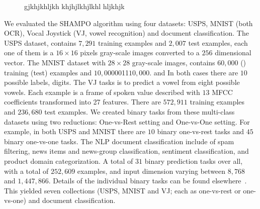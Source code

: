 \begin{figure}[!t]
\begin{centering}
\caption{gjkhjkhljkh khjhjlkhjlkhl hljkhjk  }
\end{centering}
\vspace{-0.5cm}
\end{figure}

We evaluated the SHAMPO algorithm using four datasets: USPS, MNIST (both OCR), Vocal Joystick 
(VJ, vowel recognition) and document classification. 
The USPS dataset, contains $7,291$ training examples and $2,007$ test examples, each one of them is a 
$16\times16$ pixels gray-scale images converted to a $256$ dimensional vector. 
The MNIST dataset with $28\times28$ gray-scale images, contains $60,000$ () training (test) 
examples and $10,000$0011$10,000$. and  In both cases there are $10$ possible labels, digits. The VJ tasks is to predict a vowel from 
eight possible vowels. Each example is a frame of spoken value described with $13$ MFCC coefficients 
transformed into 27 features. There are $572,911$ training examples and $236,680$ test examples. 
We created binary tasks from these multi-class datasets using two reductions: One-vs-Rest setting and 
One-vs-One setting. For example, in both USPS and MNIST there are $10$ binary one-vs-rest tasks and 
$45$ binary one-vs-one tasks.  The NLP document classification include of spam filtering, news items and 
news-group classification, sentiment classification, and product domain categorization. 
A total of $31$ binary prediction tasks over all, with a total of $252,609$ examples, and input dimension 
varying between $8,768$ and $1,447,866$. Details of the individual binary tasks can be found 
elsewhere~\cite{Crammer:2012:CLC:2343676.2343704}.
This yielded seven collections (USPS, MNIST and VJ; each as one-vs-rest or one-vs-one) and document 
classification.

